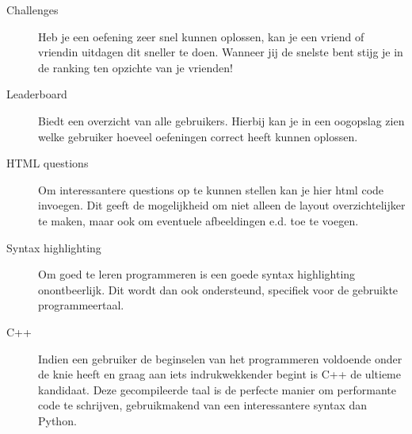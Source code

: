 \begin{description}
\item[Challenges] Heb je een oefening zeer snel kunnen oplossen, kan je een vriend of vriendin uitdagen dit sneller te doen. Wanneer jij de snelste bent stijg je
    in de ranking ten opzichte van je vrienden!
\item[Leaderboard] Biedt een overzicht van alle gebruikers. Hierbij kan je in een oogopslag zien welke gebruiker hoeveel oefeningen correct heeft kunnen oplossen.
\item[HTML questions] Om interessantere questions op te kunnen stellen kan je hier html code invoegen. Dit geeft de mogelijkheid om niet alleen de layout overzichtelijker
    te maken, maar ook om eventuele afbeeldingen e.d. toe te voegen.
\item[Syntax highlighting] Om goed te leren programmeren is een goede syntax highlighting onontbeerlijk. Dit wordt dan ook ondersteund, specifiek voor de gebruikte programmeertaal.
\item[C++] Indien een gebruiker de beginselen van het programmeren voldoende onder de knie heeft en graag aan iets indrukwekkender begint is C++ de ultieme kandidaat.
    Deze gecompileerde taal is de perfecte manier om performante code te schrijven, gebruikmakend van een interessantere syntax dan Python.
\end{description}
